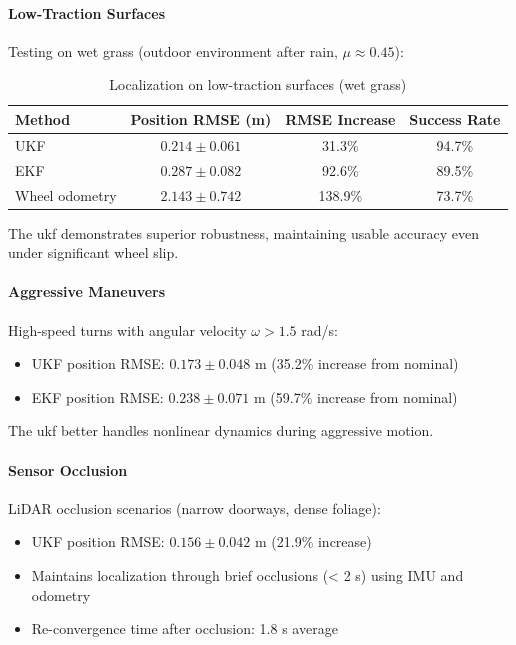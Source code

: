 \paragraph{Low-Traction Surfaces}
Testing on wet grass (outdoor environment after rain, $\mu \approx 0.45$):

\begin{table}[htbp]
\centering
\caption{Localization on low-traction surfaces (wet grass)}
\label{tab:localization_slippery}
\begin{tabular}{lccc}
\toprule
\textbf{Method} & \textbf{Position RMSE (m)} & \textbf{RMSE Increase} & \textbf{Success Rate} \\
\midrule
UKF & $0.214 \pm 0.061$ & 31.3\% & 94.7\% \\
EKF & $0.287 \pm 0.082$ & 92.6\% & 89.5\% \\
Wheel odometry & $2.143 \pm 0.742$ & 138.9\% & 73.7\% \\
\bottomrule
\end{tabular}
\end{table}

The \acrshort{ukf} demonstrates superior robustness, maintaining usable accuracy even under significant wheel slip.


\paragraph{Aggressive Maneuvers}
High-speed turns with angular velocity $\omega > 1.5$ rad/s:

\begin{itemize}
    \item UKF position RMSE: $0.173 \pm 0.048$ m (35.2\% increase from nominal)
    \item EKF position RMSE: $0.238 \pm 0.071$ m (59.7\% increase from nominal)
\end{itemize}

The \acrshort{ukf} better handles nonlinear dynamics during aggressive motion.

\paragraph{Sensor Occlusion}
LiDAR occlusion scenarios (narrow doorways, dense foliage):

\begin{itemize}
    \item UKF position RMSE: $0.156 \pm 0.042$ m (21.9\% increase)
    \item Maintains localization through brief occlusions (< 2 s) using IMU and odometry
    \item Re-convergence time after occlusion: 1.8 s average
\end{itemize}

